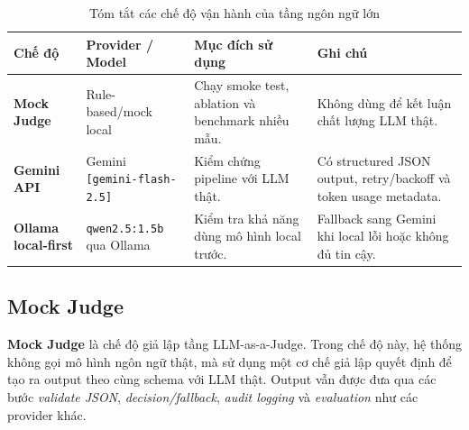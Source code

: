 \begin{table}[H]
    \centering
    \renewcommand{\arraystretch}{1.5} %
    \begin{tabularx}{\textwidth}{
        >{\raggedright\arraybackslash}p{3.2cm} %
        >{\raggedright\arraybackslash}p{3.8cm} %
        >{\raggedright\arraybackslash}X        %
        >{\raggedright\arraybackslash}X        %
    }
        \toprule
        \rowcolor{blue!5} %
        \textbf{Chế độ} & \textbf{Provider / Model} & \textbf{Mục đích sử dụng} & \textbf{Ghi chú} \\
        \midrule
        
        \textbf{Mock Judge} & 
        Rule-based/mock local & 
        Chạy smoke test, ablation và benchmark nhiều mẫu. & 
        Không dùng để kết luận chất lượng LLM thật. \\
        \hline
        
        \textbf{Gemini API} & 
        Gemini \texttt{[gemini-flash-2.5]} & 
        Kiểm chứng pipeline với LLM thật. & 
        Có structured JSON output, retry/backoff và token usage metadata. \\
        \hline
        
        \textbf{Ollama local-first} & 
        \texttt{qwen2.5:1.5b} qua Ollama & 
        Kiểm tra khả năng dùng mô hình local trước. & 
        Fallback sang Gemini khi local lỗi hoặc không đủ tin cậy. \\
        
        \bottomrule
    \end{tabularx}
    \caption{Tóm tắt các chế độ vận hành của tầng ngôn ngữ lớn}
    \label{tab:llm_modes_summary}
\end{table}

\subsection*{Mock Judge}
\textbf{Mock Judge} là chế độ giả lập tầng LLM-as-a-Judge. Trong chế độ này, hệ thống không gọi mô hình ngôn ngữ thật, mà sử dụng một cơ chế giả lập quyết định để tạo ra output theo cùng schema với LLM thật. Output vẫn được đưa qua các bước \textit{validate JSON}, \textit{decision/fallback}, \textit{audit logging} và \textit{evaluation} như các provider khác.

